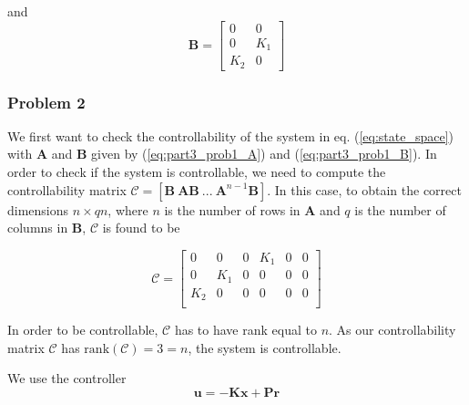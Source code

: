 and
\begin{equation} \label{eq:part3_prob1_B}
    \bm{B} = 
	\begin{bmatrix}
		0   &  0   \\
		0   &  K_1 \\
		K_2 &  0 
	\end{bmatrix}
\end{equation}






\subsubsection{Problem 2}

We first want to check the controllability of the system in eq. (\ref{eq:state_space}) with $\bm{A}$ and $\bm{B}$ given by (\ref{eq:part3_prob1_A}) and (\ref{eq:part3_prob1_B}). In order to check if the system is controllable, we need to compute the controllability matrix $\mathcal{C} = [\bm{B} \ \bm{A}\bm{B} \ ...\ \bm{A}^{n-1}\bm{B}]$. In this case, to obtain the correct dimensions $n \times qn$, where $n$ is the number of rows in $\bm{A}$ and $q$ is the number of columns in $\bm{B}$, $\mathcal{C}$ is found to be

\begin{equation}
    \mathcal{C} = 
    \begin{bmatrix}
        0       & 0     & 0     & K_1   & 0     & 0 \\
        0       & K_1   & 0     & 0     & 0     & 0 \\
        K_2     & 0     & 0     & 0     & 0     & 0 \\
    \end{bmatrix}
\end{equation}

In order to be controllable, $\mathcal{C}$ has to have rank equal to $n$. As our controllability matrix $\mathcal{C}$ has $\mathrm{rank}(\mathcal{C}) = 3 = n$, the system is controllable.\medskip

We use the controller
\begin{equation} \label{eq:part3_prob2_state_feedback}
    \bm{u} = -\bm{K}\bm{x} + \bm{P}\bm{r}
\end{equation}

